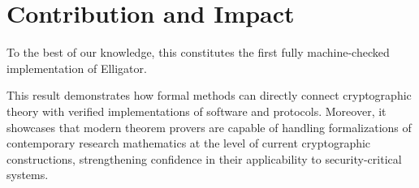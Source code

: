 \documentclass[11pt,a4paper]{article}
\begin{document}
\section{Contribution and Impact}

To the best of our knowledge, this constitutes the first fully machine-checked implementation
of Elligator.

This result demonstrates how formal methods can directly connect cryptographic theory with
verified implementations of software and protocols. Moreover, it showcases that modern theorem
provers are capable of handling formalizations of contemporary research mathematics at the level
of current cryptographic constructions, strengthening confidence in their applicability to
security-critical systems.

\printbibliography
\end{document}
